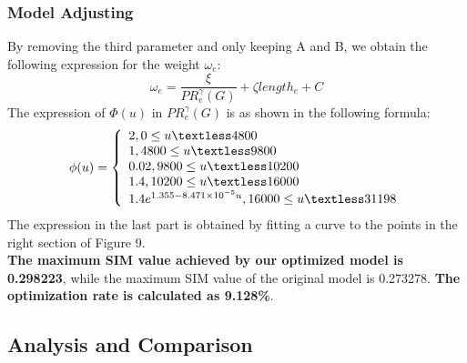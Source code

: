 \subsubsection{Model Adjusting}

\indent\indent By removing the third parameter and only keeping A and B, we obtain the following expression for the weight $\omega_e$:
\begin{equation*}
    \omega_e=\frac{\xi}{PR^{\gamma}_e(G)}+\zeta length_e+C 
\end{equation*}
\indent The expression of $\Phi(u)$ in $PR^{\gamma}_e(G)$ is as shown in the following formula:
\begin{equation*}
    \phi(u)=
    \left\{
        \begin{array}{ll}
            2, 0 \leq u \textless 4800 \\
            1, 4800 \leq u \textless 9800\\
            0.02, 9800 \leq u \textless 10200\\
            1.4, 10200 \leq u \textless 16000\\
            1.4e^{1.355-8.471\times 10^{-5} u}, 16000 \leq u \textless 31198\\
        \end{array}
        \right.
\end{equation*}
\indent The expression in the last part is obtained by fitting a curve to the points in the right section of Figure 9. \\
\indent \textbf{The maximum SIM value achieved by our optimized model is 0.298223}, while the maximum SIM value of the original model is 0.273278. \textbf{The optimization rate is calculated as 9.128\%}.

\subsection{Analysis and Comparison}

